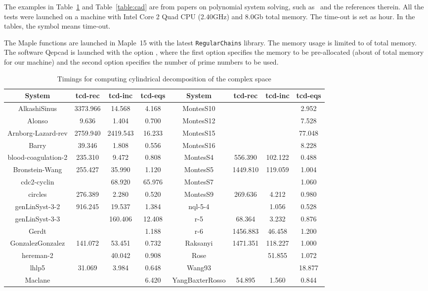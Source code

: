 \documentclass[10pt]{article}
\newcommand{\Maple}{{\sc  Maple}}
\newcommand{\RegularChains}{{\tt  Regu\-lar\-Chains}}
\newcommand{\QEPCAD}{{\sc Qepcad}}
\begin{document}
\begin{center}
The examples in Table~\ref{table:cd} and Table~\ref{table:cad}
are from papers on polynomial system solving,
such as~\cite{CGLMP07,BoulierChenLemaireMorenoMaza09}
and the references therein.
All the tests were launched
on a machine with Intel Core 2 Quad {\small CPU} (2.40{\small GHz}) 
and 8.0{\small Gb} total memory.
The time-out is set as  hour.
In the tables, the symbol  means time-out.

The {\Maple} functions are launched in {\Maple}~15
with the latest {\RegularChains} library.
The memory usage is limited to  of total memory.
The software {\QEPCAD} is launched with the option , 
where the first option specifies the memory to be pre-allocated 
(about  of total memory for our machine)
and the second option specifies the number of prime numbers to be used.


\begin{table}
\centering
\caption{Timings for computing cylindrical decomposition of the complex space}
\label{table:cd}
\begin{tabular}{|c|c|c|c||c|c|c|c|}\hline
System             & tcd-rec & tcd-inc & tcd-eqs & System & tcd-rec & tcd-inc & tcd-eqs \\ \hline
AlkashiSinus & 	  3373.966 & 	  14.568 & 	  4.168 &MontesS10 &  	  &  	  & 	  2.952 \\
Alonso & 	  9.636 & 	  1.404 & 	  0.700 &MontesS12 &  	  &  	  & 	  7.528 \\
Arnborg-Lazard-rev & 	  2759.940 & 	  2419.543 & 	  16.233 &MontesS15 &  	  &  	  & 	  77.048 \\
Barry & 	  39.346 & 	  1.808 & 	  0.556 &MontesS16 &  	  &  	  & 	  8.228 \\
blood-coagulation-2 & 	  235.310 & 	  9.472 & 	  0.808 &MontesS4 & 	  556.390 & 	  102.122 & 	  0.488 \\
Bronstein-Wang & 	  255.427 & 	  35.990 & 	  1.120 &MontesS5 & 	  1449.810 & 	  119.059 & 	  1.004 \\
cdc2-cyclin &  	  & 	  68.920 & 	  65.976 &MontesS7 &  	  &  	  & 	  1.060 \\
circles & 	  276.389 & 	  2.280 & 	  0.520 &MontesS9 & 	  269.636 & 	  4.212 & 	  0.980 \\
genLinSyst-3-2 & 	  916.245 & 	  19.537 & 	  1.384 &nql-5-4 &  	  & 	  1.056 & 	  0.528 \\
genLinSyst-3-3 &  	  & 	  160.406 & 	  12.408 &r-5 & 	  68.364 & 	  3.232 & 	  0.876 \\
Gerdt &  	  &  	  & 	  1.188 &r-6 & 	  1456.883 & 	  46.458 & 	  1.200 \\
GonzalezGonzalez & 	  141.072 & 	  53.451 & 	  0.732 &Raksanyi & 	  1471.351 & 	  118.227 & 	  1.000 \\
hereman-2 &  	  & 	  40.042 & 	  0.908 &Rose &  	  & 	  51.855 & 	  1.072 \\
lhlp5 & 	  31.069 & 	  3.984 & 	  0.648 &Wang93 &  	  &  	  & 	  18.877 \\
Maclane &  	  &  	  & 	  6.420 &YangBaxterRosso & 	  54.895 & 	  1.560 & 	  0.844 \\
\hline
\end{tabular}
\end{table}


\end{center}
\end{document}
